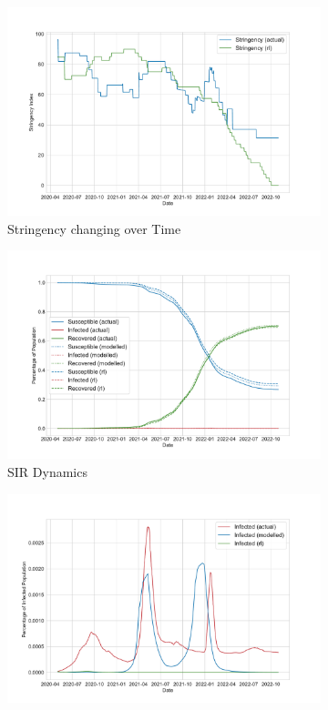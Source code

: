 \documentclass[tikz,fleqn,12pt]{wlscirep}
\begin{document}
\begin{figure}[htbp!]
  \centering
  \begin{subfigure}[t]{0.48\textwidth}
    \centering
    \includegraphics[width=\linewidth]{images/175975/rl_stringency.pdf}
    \caption{Stringency changing over Time}
    \label{fig:175975_rl_stringency}
  \end{subfigure}
  \hfill
  \begin{subfigure}[t]{0.48\textwidth}
    \centering
    \includegraphics[width=\linewidth]{images/175975/rl_sir.pdf}
    \caption{SIR Dynamics}
    \label{fig:175975_rl_sir}
  \end{subfigure}
  \hfill
  \begin{subfigure}[t]{0.48\textwidth}
    \centering
    \includegraphics[width=\linewidth]{images/175975/rl_i.pdf}

\end{subfigure}
\end{figure}
\end{document}
